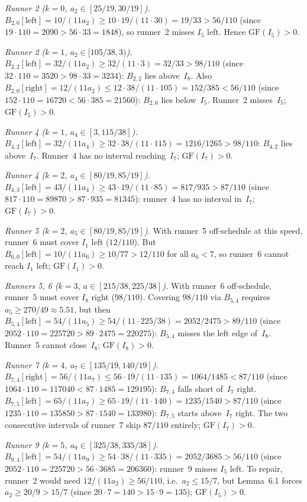 \documentclass[12pt]{article}
\begin{document}
\emph{Runner 2 ($k=0$, $a_2\in[25/19,30/19]$).}
$B_{2,0}[\mathrm{left}]=10/(11a_2)\ge 10\cdot19/(11\cdot30)=19/33>56/110$
(since $19\cdot110=2090>56\cdot33=1848$), so runner~2 misses $I_5$ left.
Hence $\mathrm{GF}(I_5)>0$.

\emph{Runner 2 ($k=1$, $a_2\in[105/38,3)$).}
$B_{2,2}[\mathrm{left}]=32/(11a_2)\ge 32/(11\cdot3)=32/33>98/110$
(since $32\cdot110=3520>98\cdot33=3234$): $B_{2,2}$ lies above~$I_8$.
Also $B_{2,0}[\mathrm{right}]=12/(11a_2)\le 12\cdot38/(11\cdot105)=152/385<56/110$
(since $152\cdot110=16720<56\cdot385=21560$): $B_{2,0}$ lies below~$I_5$.
Runner~2 misses~$I_5$; $\mathrm{GF}(I_5)>0$.

\emph{Runner 4 ($k=1$, $a_4\in[3,115/38]$).}
$B_{4,2}[\mathrm{left}]=32/(11a_4)\ge 32\cdot38/(11\cdot115)=1216/1265>98/110$:
$B_{4,2}$ lies above~$I_7$. Runner~4 has no interval reaching~$I_7$; $\mathrm{GF}(I_7)>0$.

\emph{Runner 4 ($k=2$, $a_4\in[80/19,85/19]$).}
$B_{4,3}[\mathrm{left}]=43/(11a_4)\ge 43\cdot19/(11\cdot85)=817/935>87/110$
(since $817\cdot110=89870>87\cdot935=81345$): runner~4 has no interval in~$I_7$;
$\mathrm{GF}(I_7)>0$.

\emph{Runner 5 ($k=2$, $a_5\in[80/19,85/19]$).}
With runner~5 off-schedule at this speed, runner~6 must cover $I_1$ left ($12/110$).
But $B_{6,0}[\mathrm{left}]=10/(11a_6)\ge10/77>12/110$ for all $a_6<7$,
so runner~6 cannot reach $I_1$ left; $\mathrm{GF}(I_1)>0$.

\emph{Runners 5, 6 ($k=3$, $a\in[215/38,225/38]$).}
With runner~6 off-schedule, runner~5 must cover $I_8$ right ($98/110$).
Covering $98/110$ via $B_{5,4}$ requires $a_5\ge270/49\approx5.51$, but then
$B_{5,4}[\mathrm{left}]=54/(11a_5)\ge54/(11\cdot225/38)=2052/2475>89/110$
(since $2052\cdot110=225720>89\cdot2475=220275$): $B_{5,4}$ misses the left edge
of~$I_8$. Runner~5 cannot close~$I_8$; $\mathrm{GF}(I_8)>0$.

\emph{Runner 7 ($k=4$, $a_7\in[135/19,140/19]$).}
$B_{7,4}[\mathrm{right}]=56/(11a_7)\le56\cdot19/(11\cdot135)=1064/1485<87/110$
(since $1064\cdot110=117040<87\cdot1485=129195$): $B_{7,4}$ falls short of~$I_7$ right.
$B_{7,5}[\mathrm{left}]=65/(11a_7)\ge65\cdot19/(11\cdot140)=1235/1540>87/110$
(since $1235\cdot110=135850>87\cdot1540=133980$): $B_{7,5}$ starts above~$I_7$ right.
The two consecutive intervals of runner~7 skip $87/110$ entirely; $\mathrm{GF}(I_7)>0$.

\emph{Runner 9 ($k=5$, $a_9\in[325/38,335/38]$).}
$B_{9,4}[\mathrm{left}]=54/(11a_9)\ge54\cdot38/(11\cdot335)=2052/3685>56/110$
(since $2052\cdot110=225720>56\cdot3685=206360$): runner~9 misses $I_5$ left.
To repair, runner~2 would need $12/(11a_2)\ge56/110$, i.e.\ $a_2\le15/7$,
but Lemma~6.1 forces $a_2\ge20/9>15/7$ (since $20\cdot7=140>15\cdot9=135$);
$\mathrm{GF}(I_5)>0$.
\end{document}
